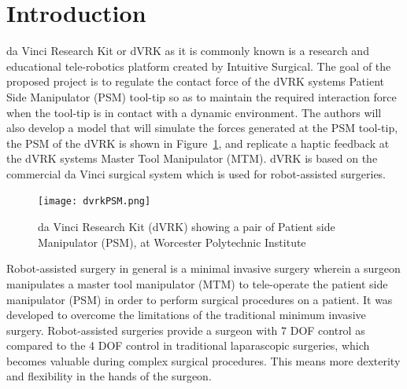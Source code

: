 \documentclass[10pt,journal,compsoc]{IEEEtran}
\begin{document}
\maketitle

\ifCLASSOPTIONcompsoc
{}
\else
\section{Introduction}
\label{sec:introduction}
\fi

 da Vinci Research Kit or dVRK as it is commonly known is a research and educational tele-robotics platform created by Intuitive Surgical. The goal of the proposed project is to regulate the contact force of the dVRK system\textquotesingle s Patient Side Manipulator (PSM) tool-tip so as to maintain the required interaction force when the tool-tip is in contact with a dynamic environment. The authors will also develop a model that will simulate the forces generated at the PSM tool-tip, the PSM of the dVRK is shown in Figure~\ref{fig:dvrkPSM}, and replicate a haptic feedback at the dVRK system\textquotesingle s Master Tool Manipulator (MTM). dVRK is based on the commercial da Vinci surgical system which is used for robot-assisted surgeries.

\begin{figure}[htbp]
\begin{center}
\texttt{[image: dvrkPSM.png]}
\caption{da Vinci Research Kit (dVRK) showing a pair of Patient side Manipulator (PSM), at Worcester Polytechnic Institute}
\label{fig:dvrkPSM}
\end{center}
\end{figure}

Robot-assisted surgery in general is a minimal invasive surgery wherein a surgeon manipulates a master tool manipulator (MTM) to tele-operate the patient side manipulator (PSM) in order to perform surgical procedures on a patient. It was developed to overcome the limitations of the traditional minimum invasive surgery. Robot-assisted surgeries provide a surgeon with 7 DOF control as compared to the 4 DOF control in traditional laparascopic surgeries, which becomes valuable during complex surgical procedures. This means more dexterity and flexibility in the hands of the surgeon.
\end{document}

